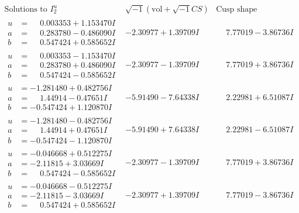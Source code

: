 \documentclass[1p]{elsarticle_modified}
\theoremstyle{definition}
\newcommand{\I}{\sqrt{-1}}
\begin{document}
$$\begin{array}{c|c|c}  
\text{Solutions to }I^u_{2}& \I (\text{vol} + \sqrt{-1}CS) & \text{Cusp shape}\\
 \hline 
\begin{aligned}
u &= \phantom{-}0.003353 + 1.153470 I \\
a &= \phantom{-}0.283780 - 0.486090 I \\
b &= \phantom{-}0.547424 + 0.585652 I\end{aligned}
 & -2.30977 + 1.39709 I & \phantom{-}7.77019 - 3.86736 I \\ \hline\begin{aligned}
u &= \phantom{-}0.003353 - 1.153470 I \\
a &= \phantom{-}0.283780 + 0.486090 I \\
b &= \phantom{-}0.547424 - 0.585652 I\end{aligned}
 & -2.30977 - 1.39709 I & \phantom{-}7.77019 + 3.86736 I \\ \hline\begin{aligned}
u &= -1.281480 + 0.482756 I \\
a &= \phantom{-}1.44914 - 0.47651 I \\
b &= -0.547424 + 1.120870 I\end{aligned}
 & -5.91490 - 7.64338 I & \phantom{-}2.22981 + 6.51087 I \\ \hline\begin{aligned}
u &= -1.281480 - 0.482756 I \\
a &= \phantom{-}1.44914 + 0.47651 I \\
b &= -0.547424 - 1.120870 I\end{aligned}
 & -5.91490 + 7.64338 I & \phantom{-}2.22981 - 6.51087 I \\ \hline\begin{aligned}
u &= -0.046668 + 0.512275 I \\
a &= -2.11815 + 3.03669 I \\
b &= \phantom{-}0.547424 - 0.585652 I\end{aligned}
 & -2.30977 - 1.39709 I & \phantom{-}7.77019 + 3.86736 I \\ \hline\begin{aligned}
u &= -0.046668 - 0.512275 I \\
a &= -2.11815 - 3.03669 I \\
b &= \phantom{-}0.547424 + 0.585652 I\end{aligned}
 & -2.30977 + 1.39709 I & \phantom{-}7.77019 - 3.86736 I \\ \hline\begin{aligned}

\end{aligned}
\end{array}$$
\end{document}
